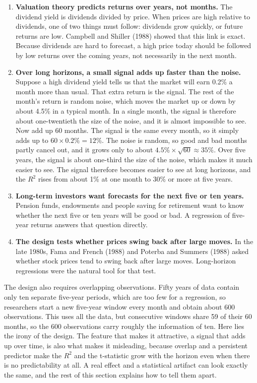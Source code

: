 \begin{enumerate}
  \item \textbf{Valuation theory predicts returns over years, not months.} The dividend yield is dividends divided by price. When prices are high relative to dividends, one of two things must follow: dividends grow quickly, or future returns are low. Campbell and Shiller (1988) showed that this link is exact. Because dividends are hard to forecast, a high price today should be followed by low returns over the coming years, not necessarily in the next month.
  \item \textbf{Over long horizons, a small signal adds up faster than the noise.} Suppose a high dividend yield tells us that the market will earn 0.2\% a month more than usual. That extra return is the signal. The rest of the month's return is random noise, which moves the market up or down by about 4.5\% in a typical month. In a single month, the signal is therefore about one-twentieth the size of the noise, and it is almost impossible to see. Now add up 60 months. The signal is the same every month, so it simply adds up to $60 \times 0.2\% = 12\%$. The noise is random, so good and bad months partly cancel out, and it grows only to about $4.5\% \times \sqrt{60} \approx 35\%$. Over five years, the signal is about one-third the size of the noise, which makes it much easier to see. The signal therefore becomes easier to see at long horizons, and the $R^2$ rises from about 1\% at one month to 30\% or more at five years.
  \item \textbf{Long-term investors want forecasts for the next five or ten years.} Pension funds, endowments and people saving for retirement want to know whether the next five or ten years will be good or bad. A regression of five-year returns answers that question directly.
  \item \textbf{The design tests whether prices swing back after large moves.} In the late 1980s, Fama and French (1988) and Poterba and Summers (1988) asked whether stock prices tend to swing back after large moves. Long-horizon regressions were the natural tool for that test.
\end{enumerate}

The design also requires overlapping observations. Fifty years of data contain only ten separate five-year periods, which are too few for a regression, so researchers start a new five-year window every month and obtain about 600 observations. This uses all the data, but consecutive windows share 59 of their 60 months, so the 600 observations carry roughly the information of ten. Here lies the irony of the design. The feature that makes it attractive, a signal that adds up over time, is also what makes it misleading, because overlap and a persistent predictor make the $R^2$ and the t-statistic grow with the horizon even when there is no predictability at all. A real effect and a statistical artifact can look exactly the same, and the rest of this section explains how to tell them apart.


